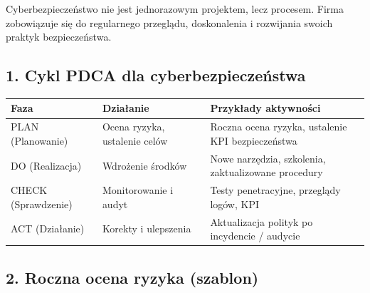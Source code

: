 \documentclass[12pt,a4paper]{article}
\begin{document}
Cyberbezpieczeństwo nie jest jednorazowym projektem, lecz procesem.
Firma zobowiązuje się do regularnego przeglądu, doskonalenia i
rozwijania swoich praktyk bezpieczeństwa.

\subsection{1. Cykl PDCA dla
cyberbezpieczeństwa}\label{cykl-pdca-dla-cyberbezpieczeux144stwa}

\begin{longtable}[]{@{}>{\raggedright\arraybackslash}p{}>{\raggedright\arraybackslash}p{}>{\raggedright\arraybackslash}p{}@{}}
\toprule\noalign{}
Faza & Działanie & Przykłady aktywności \\
\midrule\noalign{}
\endhead
\bottomrule\noalign{}
\endlastfoot
[P] PLAN (Planowanie) & Ocena ryzyka, ustalenie celów & Roczna ocena
ryzyka, ustalenie KPI bezpieczeństwa \\
[D] DO (Realizacja) & Wdrożenie środków & Nowe narzędzia, szkolenia,
zaktualizowane procedury \\
[C] CHECK (Sprawdzenie) & Monitorowanie i audyt & Testy penetracyjne,
przeglądy logów, KPI \\
[A] ACT (Działanie) & Korekty i ulepszenia & Aktualizacja polityk po
incydencie / audycie \\
\end{longtable}

\subsection{2. Roczna ocena ryzyka
(szablon)}\label{roczna-ocena-ryzyka-szablon}
\end{document}

